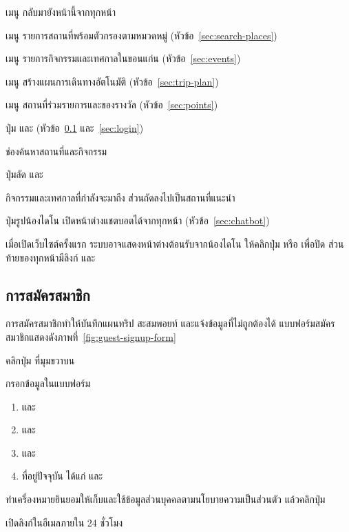 \begin{calloutlist}
  \item เมนู  กลับมายังหน้านี้จากทุกหน้า
  \item เมนู  รายการสถานที่พร้อมตัวกรองตามหมวดหมู่ (หัวข้อ~\ref{sec:search-places})
  \item เมนู  รายการกิจกรรมและเทศกาลในขอนแก่น (หัวข้อ~\ref{sec:events})
  \item เมนู  สร้างแผนการเดินทางอัตโนมัติ (หัวข้อ~\ref{sec:trip-plan})
  \item เมนู  สถานที่ร่วมรายการและของรางวัล (หัวข้อ~\ref{sec:points})
  \item ปุ่ม  และ  (หัวข้อ~\ref{sec:register} และ~\ref{sec:login})
  \item ช่องค้นหาสถานที่และกิจกรรม
  \item ปุ่มลัด  และ 
  \item กิจกรรมและเทศกาลที่กำลังจะมาถึง ส่วนถัดลงไปเป็นสถานที่แนะนำ
  \item ปุ่มรูปน้องไดโน เปิดหน้าต่างแชตบอตได้จากทุกหน้า (หัวข้อ~\ref{sec:chatbot})
\end{calloutlist}

เมื่อเปิดเว็บไซต์ครั้งแรก ระบบอาจแสดงหน้าต่างต้อนรับจากน้องไดโน ให้คลิกปุ่ม  หรือ  เพื่อปิด ส่วนท้ายของทุกหน้ามีลิงก์  และ 

\subsection{การสมัครสมาชิก}
\label{sec:register}

การสมัครสมาชิกทำให้บันทึกแผนทริป สะสมพอยท์ และแจ้งข้อมูลที่ไม่ถูกต้องได้ แบบฟอร์มสมัครสมาชิกแสดงดังภาพที่~\ref{fig:guest-signup-form}


\begin{steps}
  \item คลิกปุ่ม  ที่มุมขวาบน
  \item กรอกข้อมูลในแบบฟอร์ม
        \begin{enumerate}
          \item {}     และ 
          \item {} และ 
          \item {} และ 
          \item ที่อยู่ปัจจุบัน ได้แก่   และ 
        \end{enumerate}
  \item ทำเครื่องหมายยินยอมให้เก็บและใช้ข้อมูลส่วนบุคคลตามนโยบายความเป็นส่วนตัว แล้วคลิกปุ่ม 
  \item เปิดลิงก์ในอีเมลภายใน 24 ชั่วโมง
\end{steps}

